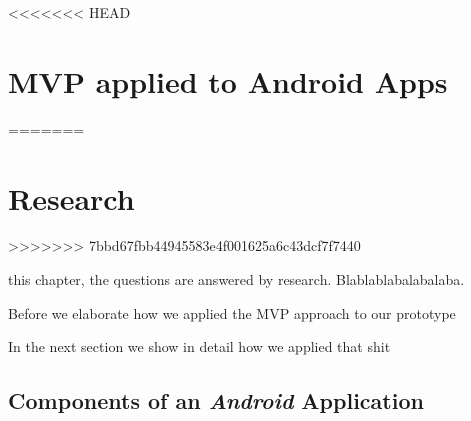 %



<<<<<<< HEAD
\section{MVP applied to Android Apps}
=======
\section{Research}
\label{sec:research}
>>>>>>> 7bbd67fbb44945583e4f001625a6c43dcf7f7440

 this chapter, the questions are answered by research. Blablablabalabalaba.


Before we elaborate how we applied the MVP approach to our prototype

In the next section we show in detail how we applied that shit


\subsection{Components of an \emph{Android} Application}

